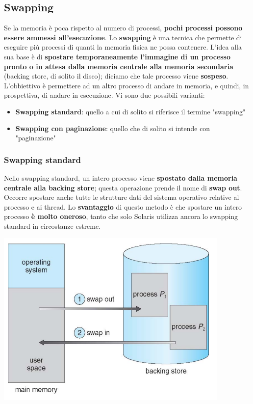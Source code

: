 \documentclass[12pt]{article}
\begin{document}
\subsection{Swapping}
Se la memoria è poca rispetto al numero di processi, \textbf{pochi processi possono essere ammessi all'esecuzione}.
Lo \textbf{swapping} è una tecnica che permette di eseguire più processi di quanti la memoria fisica ne possa contenere.
L'idea alla sua base è di \textbf{spostare temporaneamente l'immagine di un processo pronto o in attesa dalla memoria centrale alla memoria secondaria} (backing store, di solito il disco);
diciamo che tale processo viene \textbf{sospeso}.
L'obbiettivo è permettere ad un altro processo di andare in memoria, e quindi, in prospettiva, di andare in esecuzione.
Vi sono due possibili varianti:
\begin{itemize}
    \item \textbf{Swapping standard}: quello a cui di solito si riferisce il termine "swapping"
    \item \textbf{Swapping con paginazione}: quello che di solito si intende con "paginazione"
\end{itemize}
\subsubsection{Swapping standard}
Nello swapping standard, un intero processo viene \textbf{spostato dalla memoria centrale alla backing store}; questa operazione prende il nome di \textbf{swap out}.
Occorre spostare anche tutte le strutture dati del sistema operativo relative al processo e ai thread.
Lo \textbf{svantaggio} di questo metodo è che spostare un intero processo \textbf{è molto oneroso}, tanto che solo Solaris utilizza ancora lo swapping standard in circostanze estreme.
\begin{center}
    \includegraphics[width = 0.70\linewidth]{Images/66.png}
\end{center}
\end{document}
